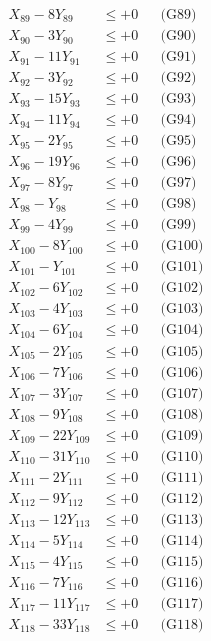 \documentclass[a4paper,10pt]{article}
\begin{document}
{\begin{align}
X_{89} - 8Y_{89} &\leq +0 && \text{(G89)} \\
X_{90} - 3Y_{90} &\leq +0 && \text{(G90)} \\
X_{91} - 11Y_{91} &\leq +0 && \text{(G91)} \\
X_{92} - 3Y_{92} &\leq +0 && \text{(G92)} \\
X_{93} - 15Y_{93} &\leq +0 && \text{(G93)} \\
\allowbreak
X_{94} - 11Y_{94} &\leq +0 && \text{(G94)} \\
X_{95} - 2Y_{95} &\leq +0 && \text{(G95)} \\
X_{96} - 19Y_{96} &\leq +0 && \text{(G96)} \\
X_{97} - 8Y_{97} &\leq +0 && \text{(G97)} \\
X_{98} - Y_{98} &\leq +0 && \text{(G98)} \\
X_{99} - 4Y_{99} &\leq +0 && \text{(G99)} \\
X_{100} - 8Y_{100} &\leq +0 && \text{(G100)} \\
X_{101} - Y_{101} &\leq +0 && \text{(G101)} \\
X_{102} - 6Y_{102} &\leq +0 && \text{(G102)} \\
X_{103} - 4Y_{103} &\leq +0 && \text{(G103)} \\
\allowbreak
X_{104} - 6Y_{104} &\leq +0 && \text{(G104)} \\
X_{105} - 2Y_{105} &\leq +0 && \text{(G105)} \\
X_{106} - 7Y_{106} &\leq +0 && \text{(G106)} \\
X_{107} - 3Y_{107} &\leq +0 && \text{(G107)} \\
X_{108} - 9Y_{108} &\leq +0 && \text{(G108)} \\
X_{109} - 22Y_{109} &\leq +0 && \text{(G109)} \\
X_{110} - 31Y_{110} &\leq +0 && \text{(G110)} \\
X_{111} - 2Y_{111} &\leq +0 && \text{(G111)} \\
X_{112} - 9Y_{112} &\leq +0 && \text{(G112)} \\
X_{113} - 12Y_{113} &\leq +0 && \text{(G113)} \\
\allowbreak
X_{114} - 5Y_{114} &\leq +0 && \text{(G114)} \\
X_{115} - 4Y_{115} &\leq +0 && \text{(G115)} \\
X_{116} - 7Y_{116} &\leq +0 && \text{(G116)} \\
X_{117} - 11Y_{117} &\leq +0 && \text{(G117)} \\
X_{118} - 33Y_{118} &\leq +0 && \text{(G118)} \\

\end{align}}
\end{document}
